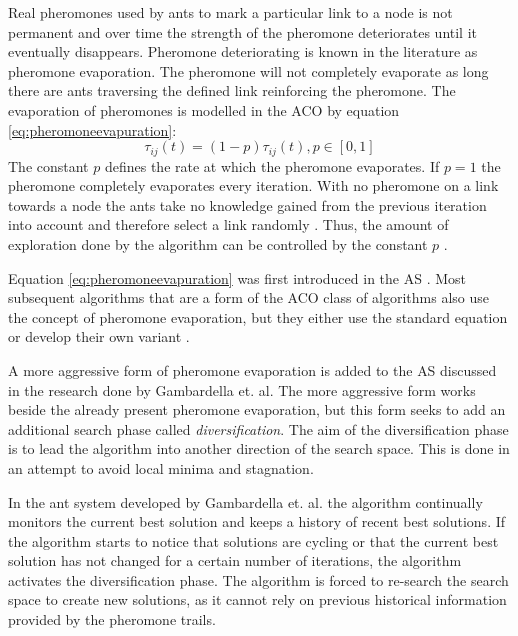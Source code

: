 Real pheromones used by ants to mark a particular link to a node is not permanent and over time the strength of the pheromone deteriorates until it eventually disappears. Pheromone deteriorating is known in the literature as pheromone evaporation. The pheromone will not completely evaporate as long there are ants traversing the defined link reinforcing the pheromone. The evaporation of pheromones is modelled in the \gls{ACO} by equation \ref{eq:pheromoneevapuration}\cite{CompuIntelligenceIntro,AntsAndStigmergy,AntIntroTrends,AntSurvey}:
\begin{equation}
\label{eq:pheromoneevapuration}
	\tau_{ij}(t) = (1-p)\tau_{ij}(t), p\in [0,1]
\end{equation}
The constant $p$ defines the rate at which the pheromone evaporates. If $p=1$ the pheromone completely evaporates every iteration. With no pheromone on a link towards a node the ants take no knowledge gained from the previous iteration into account and therefore select a link randomly \cite{CompuIntelligenceIntro,AntsAndStigmergy}. Thus, the amount of exploration done by the algorithm can be controlled by the constant $p$ \cite{CompuIntelligenceIntro,AntsAndStigmergy}.

Equation \ref{eq:pheromoneevapuration} was first introduced in the \gls{AS} \cite{CompuIntelligenceIntro,AntsAndStigmergy,AntIntroTrends,AntSurvey}. Most subsequent algorithms that are a form of the \gls{ACO} class of algorithms also use the concept of pheromone evaporation, but they either use the standard equation or develop their own variant \cite{CompuIntelligenceIntro,AntsAndStigmergy,AntIntroTrends,AntSurvey}.

A more aggressive form of pheromone evaporation  is added to the \gls{AS} discussed in the research done by Gambardella et. al\cite{AntQAP}. The more aggressive form works beside the already present pheromone evaporation, but this form seeks to add an additional search phase called \emph{diversification}\cite{AntQAP}. The aim of the diversification phase is to lead the algorithm into another direction of the search space\cite{AntQAP}. This is done in an attempt to avoid local minima and stagnation\cite{AntQAP}.

In the ant system developed by Gambardella et. al. the algorithm continually monitors the current best solution and keeps a history of recent best solutions\cite{AntQAP}. If the algorithm starts to notice that solutions are cycling or that the current best solution has not changed for a certain number of iterations, the algorithm activates the diversification phase\cite{AntQAP}. The algorithm is forced to re-search the search space to create new solutions, as it cannot rely on previous historical information provided by the pheromone trails\cite{AntQAP}.

